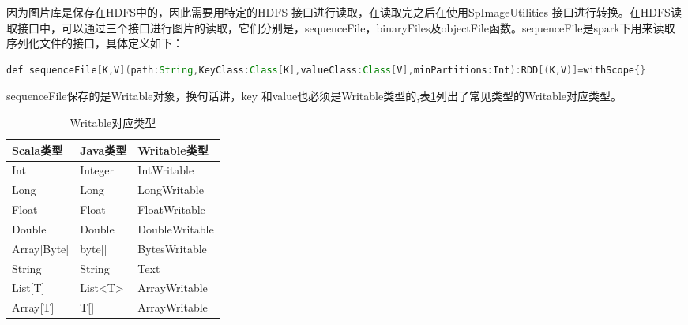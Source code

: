因为图片库是保存在HDFS中的，因此需要用特定的HDFS 接口进行读取，在读取完之后在使用SpImageUtilities 接口进行转换。在HDFS读取接口中，可以通过三个接口进行图片的读取，它们分别是，sequenceFile，binaryFiles及objectFile函数。sequenceFile是spark下用来读取序列化文件的接口，具体定义如下：
\begin{lstlisting}[language=Java,numbers=none]
def sequenceFile[K,V](path:String,KeyClass:Class[K],valueClass:Class[V],minPartitions:Int):RDD[(K,V)]=withScope{}
\end{lstlisting}
sequenceFile保存的是Writable对象，换句话讲，key 和value也必须是Writable类型的,表\ref{tab:Writable}列出了常见类型的Writable对应类型。
\begin{table}[h] %
\caption{Writable对应类型} %
\centering
\label{tab:Writable}
\begin{tabular}{p{4cm}|p{2cm}|p{6cm}} %
\hline
\hline
Scala类型  & Java类型 & Writable类型 \\ %
\hline %
Int  & Integer & IntWritable\\
\hline
Long  & Long & LongWritable\\
\hline
Float  & Float & FloatWritable\\
\hline
Double  & Double & DoubleWritable\\
\hline
Array[Byte]  & byte[] & BytesWritable\\
\hline
String  & String & Text\\
\hline
List[T] & List<T> & ArrayWritable\\
\hline
Array[T] & T[] & ArrayWritable\\
\hline
\hline
\end{tabular}
\end{table}

